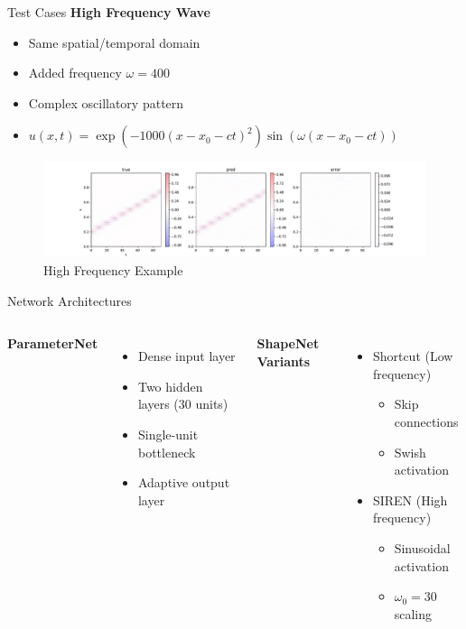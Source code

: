 \documentclass{beamer}
\begin{document}
\begin{frame}{Test Cases}
    \textbf{High Frequency Wave}
    \begin{itemize}
        \item Same spatial/temporal domain
        \item Added frequency $\omega = 400$
        \item Complex oscillatory pattern
        \item $u(x,t) = \exp(-1000(x-x_0-ct)^2)\sin(\omega(x-x_0-ct))$
    \end{itemize}
        
    \begin{figure}
        \includegraphics[width=\textwidth]{functional/high-frequency-adam-20250206-1520-1/vis}
        \caption{High Frequency Example}
    \end{figure}
\end{frame}

\begin{frame}{Network Architectures}
    \begin{columns}
        \textbf{ParameterNet}
        \begin{itemize}
            \item Dense input layer
            \item Two hidden layers (30 units)
            \item Single-unit bottleneck
            \item Adaptive output layer
        \end{itemize}
        
        \textbf{ShapeNet Variants}
        \begin{itemize}
            \item Shortcut (Low frequency)
            \begin{itemize}
                \item Skip connections
                \item Swish activation
            \end{itemize}
            \item SIREN (High frequency)
            \begin{itemize}
                \item Sinusoidal activation
                \item $\omega_0 = 30$ scaling
            \end{itemize}
        \end{itemize}
    \end{columns}
\end{frame}
\end{document}
